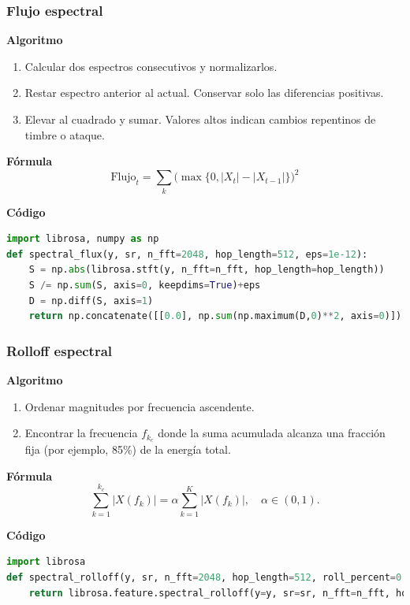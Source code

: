 \subsubsection{Flujo espectral}
\textbf{Algoritmo} \parencite{foote1999novelty, muller2015fmp}
\begin{enumerate}
  \item Calcular dos espectros consecutivos y normalizarlos.
  \item Restar espectro anterior al actual. Conservar solo las diferencias positivas.
  \item Elevar al cuadrado y sumar. Valores altos indican cambios repentinos de timbre o ataque.
\end{enumerate}

\textbf{Fórmula}
\[
  \text{Flujo}_t=\sum_k\big(\max\{0, |X_t|-|X_{t-1}|\}\big)^2
\]

\textbf{Código}
\begin{lstlisting}[language=Python, label={lst:flux_code}, caption={Flujo espectral}]
import librosa, numpy as np
def spectral_flux(y, sr, n_fft=2048, hop_length=512, eps=1e-12):
    S = np.abs(librosa.stft(y, n_fft=n_fft, hop_length=hop_length))
    S /= np.sum(S, axis=0, keepdims=True)+eps
    D = np.diff(S, axis=1)
    return np.concatenate([[0.0], np.sum(np.maximum(D,0)**2, axis=0)])
\end{lstlisting}

\subsubsection{Rolloff espectral}
\textbf{Algoritmo} \parencite{tzanetakis2002musical, peeters2004large}
\begin{enumerate}
  \item Ordenar magnitudes por frecuencia ascendente.
  \item Encontrar la frecuencia \(f_{k_c}\) donde la suma acumulada alcanza una fracción fija (por ejemplo, 85\%) de la energía total.
\end{enumerate}

\textbf{Fórmula}
\[
  \sum_{k=1}^{k_c}|X(f_k)|=\alpha\sum_{k=1}^{K}|X(f_k)|,\quad \alpha\in(0,1).
\]

\textbf{Código}
\begin{lstlisting}[language=Python, label={lst:rolloff_code}, caption={Rolloff espectral}]
import librosa
def spectral_rolloff(y, sr, n_fft=2048, hop_length=512, roll_percent=0.85):
    return librosa.feature.spectral_rolloff(y=y, sr=sr, n_fft=n_fft, hop_length=hop_length, roll_percent=roll_percent)[0]
\end{lstlisting}


